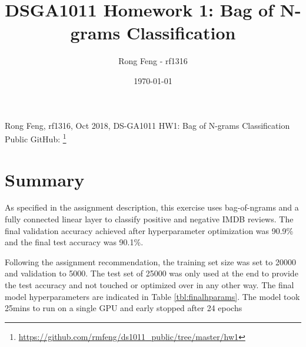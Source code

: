 \documentclass[a4paper,10pt]{article}
\title{DSGA1011 Homework 1: Bag of N-grams Classification}
\author{Rong Feng - rf1316}
\date{\printdayoff\today}
\begin{document}
Rong Feng, rf1316, Oct 2018, DS-GA1011 HW1: Bag of N-grams Classification \\ 
Public GitHub: \footnote{\url{https://github.com/rmfeng/ds1011_public/tree/master/hw1}}

\section{Summary}
\par 
\justify
As specified in the assignment description, this exercise uses bag-of-ngrams and a fully connected linear layer to classify positive and negative IMDB reviews. The final validation accuracy achieved after hyperparameter optimization was 90.9\% and the final test accuracy was 90.1\%. 

\par
\justify
Following the assignment recommendation, the training set size was set to 20000 and validation to 5000. The test set of 25000 was only used at the end to provide the test accuracy and not touched or optimized over in any other way. The final model hyperparameters are indicated in Table \ref{tbl:finalhparams}. The model took 25mins to run on a single GPU and early stopped after 24 epochs
\end{document}
